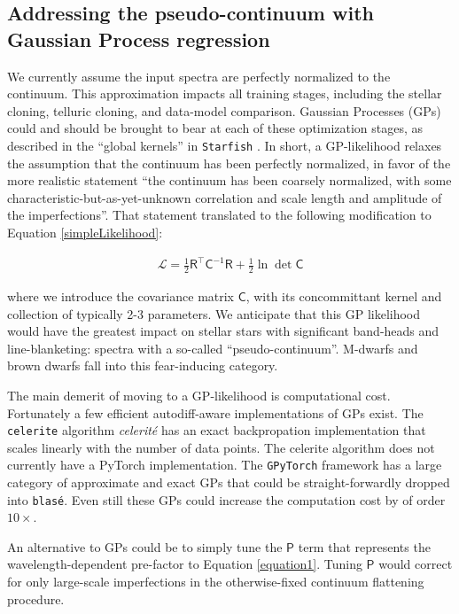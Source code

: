 \documentclass[modern]{aastex631}
\begin{document}
\subsection{Addressing the pseudo-continuum with Gaussian Process regression}

We currently assume the input spectra are perfectly normalized to the continuum.  This approximation impacts all training stages, including the stellar cloning, telluric cloning, and data-model comparison.  Gaussian Processes (GPs) could and should be brought to bear at each of these optimization stages, as described in the ``global kernels'' in \texttt{Starfish} \citet{czekala15}.  In short, a GP-likelihood relaxes the assumption that the continuum has been perfectly normalized, in favor of the more realistic statement ``the continuum has been coarsely normalized, with some characteristic-but-as-yet-unknown correlation and scale length and amplitude of the imperfections''.  That statement translated to the following modification to Equation \ref{simpleLikelihood}:

\begin{eqnarray}
    \mathcal{L} =  \frac{1}{2}\mathsf{R^\intercal} \mathsf{C}^{-1} \mathsf{R} +\frac{1}{2}\ln{\det{\mathsf{C}}} \label{GPLikelihood}
\end{eqnarray}

where we introduce the covariance matrix $\mathsf{C}$, with its concommittant kernel and collection of typically 2-3 parameters.  We anticipate that this GP likelihood would have the greatest impact on stellar stars with significant band-heads and line-blanketing: spectra with a so-called ``pseudo-continuum''.  M-dwarfs and brown dwarfs fall into this fear-inducing category.

The main demerit of moving to a GP-likelihood is computational cost.  Fortunately a few efficient autodiff-aware implementations of GPs exist. The \texttt{celerite} algorithm \emph{celerit\'e} \citep{2017AJ....154..220F} has an exact backpropation implementation \citep{2018RNAAS...2...31F} that scales linearly with the number of data points.  The celerite algorithm does not currently have a PyTorch implementation.  The \texttt{GPyTorch} framework \citep{2018arXiv180911165G} has a large category of approximate and exact GPs that could be straight-forwardly dropped into \texttt{blas\'e}.  Even still these GPs could increase the computation cost by of order $10\times$.

An alternative to GPs could be to simply tune the $\mathsf{P}$ term that represents the wavelength-dependent pre-factor to Equation \ref{equation1}.  Tuning $\mathsf{P}$ would correct for only large-scale imperfections in the otherwise-fixed continuum flattening procedure.
\end{document}
